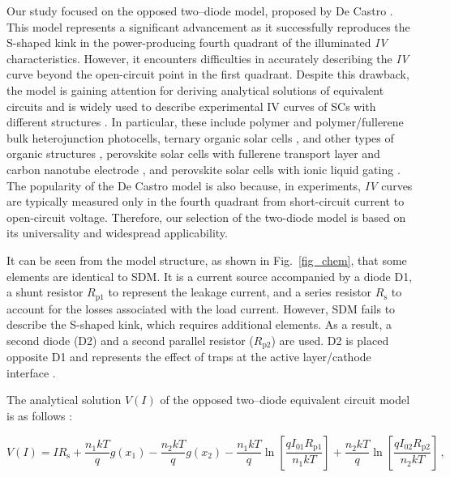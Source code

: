 \documentclass[a4paper,fleqn]{cas-sc}
\begin{document}
Our study focused on the opposed two--diode model, proposed by De Castro \cite{Castro2010}.
This model represents a significant advancement
as it successfully reproduces the S-shaped kink in the power-producing fourth quadrant
of the illuminated \emph{IV} characteristics.
However, it encounters difficulties in accurately describing the \emph{IV} curve beyond the open-circuit point in the first quadrant.
Despite this drawback, the model is gaining attention for deriving analytical solutions
of equivalent circuits \cite{Yu2019a}
and is widely used to describe experimental IV curves of SCs with different structures
\cite{CastroUseBook,Pillai2017,Arredondo2018,delPozo2012,BrenesBadilla2018,Tada2015Organic,Makha2018,CastroUsePerovskitIonikLiquid,CastroUsePerovskitFullerene}.
In particular, these include polymer \cite{Tada2015Organic}
and polymer/fullerene \cite{delPozo2012} bulk heterojunction photocells,
ternary organic solar cells \cite{Makha2018},
and other types of organic structures \cite{Pillai2017,Arredondo2018},
perovskite solar cells with fullerene transport layer and carbon nanotube electrode \cite{CastroUsePerovskitFullerene},
and perovskite solar cells with ionic liquid gating \cite{CastroUsePerovskitIonikLiquid}.
The popularity of the De Castro model is also because, in experiments,
\emph{IV} curves are typically measured only in the fourth quadrant from short-circuit current to open-circuit voltage.
Therefore, our selection of the two-diode model is based on its universality and widespread applicability.

It can be seen from the model structure, as shown in Fig.~\ref{fig_chem}, that some elements are identical to SDM.
It is a current source accompanied by a diode D1, a shunt resistor $R_\mathrm{p1}$ to represent the leakage current,
and a series resistor $R_\mathrm{s}$ to account for the losses associated with the load current.
However, SDM fails to describe the S-shaped kink, which requires additional elements. 
As a result, a second diode  (D2) and a second parallel resistor ($R_\mathrm{p2}$) are used.
D2 is placed opposite D1 and represents the effect of traps at the active layer/cathode interface \cite{Castro2010}.

The analytical solution $V(I)$ of the opposed two--diode equivalent circuit model
is as follows \cite{CastroSolution,roberts2015calculating}:

\begin{equation}
\label{eqIV_g}
V(I)= IR_\mathrm{s}+\frac{n_1kT}{q}g(x_1)-\frac{n_2kT}{q}g(x_2)
  -\frac{n_1kT}{q}\ln\left[\frac{qI_{01}R_\mathrm{p1}}{n_1kT}\right] +\frac{n_2kT}{q}\ln\left[\frac{qI_{02}R_\mathrm{p2}}{n_2kT}\right]\,,
\end{equation}
\end{document}
